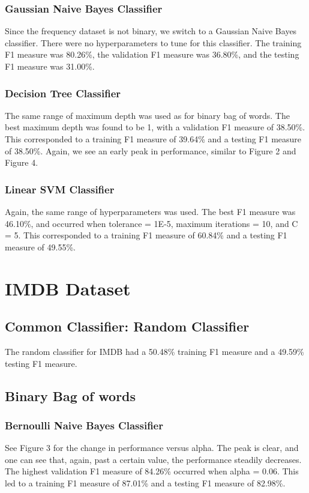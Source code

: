 \documentclass[11pt]{article}
\begin{document}
\subsubsection{Gaussian Naive Bayes Classifier}
Since the frequency dataset is not binary, we switch to a Gaussian Naive Bayes classifier. There were no hyperparameters to tune for this classifier. The training F1 measure was 80.26\%, the validation F1 measure was 36.80\%, and the testing F1 measure was 31.00\%. 

\subsubsection{Decision Tree Classifier}
The same range of maximum depth was used as for binary bag of words. The best maximum depth was found to be 1, with a validation F1 measure of 38.50\%. This corresponded to a training F1 measure of 39.64\% and a testing F1 measure of 38.50\%. Again, we see an early peak in performance, similar to Figure 2 and Figure 4.

\subsubsection{Linear SVM Classifier}
Again, the same range of hyperparameters was used. The best F1 measure was 46.10\%, and occurred when tolerance = 1E-5, maximum iterations = 10, and C = 5. This corresponded to a training F1 measure of 60.84\% and a testing F1 measure of 49.55\%.

\section{IMDB Dataset}
\subsection{Common Classifier: Random Classifier}
The random classifier for IMDB had a 50.48\% training F1 measure and a 49.59\% testing F1 measure.

\subsection{Binary Bag of words}

\subsubsection{Bernoulli Naive Bayes Classifier}
See Figure 3 for the change in performance versus alpha. The peak is clear, and one can see that, again, past a certain value, the performance steadily decreases. The highest validation F1 measure of 84.26\% occurred when alpha = 0.06. This led to a training F1 measure of 87.01\% and a testing F1 measure of 82.98\%.
\end{document}
